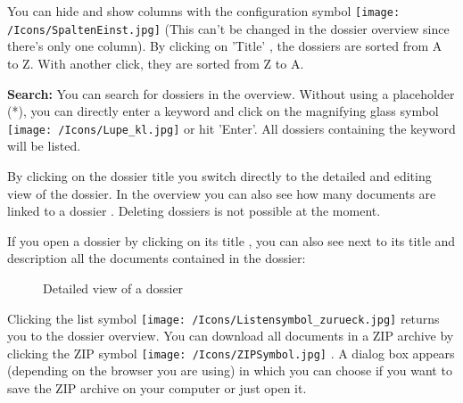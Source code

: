 You can hide and show columns with the configuration symbol \texttt{[image: /Icons/SpaltenEinst.jpg]}  (This can't be changed in the dossier overview since there's only one column). By clicking on 'Title' , the dossiers are sorted from A to Z. With another click, they are sorted from Z to A.

\vspace{\baselineskip}

\textbf{Search:} You can search for dossiers in the overview. Without using a placeholder (*), you can directly enter a keyword and click on the magnifying glass symbol \texttt{[image: /Icons/Lupe\_kl.jpg]}  or hit 'Enter'. All dossiers containing the keyword will be listed. \newline

By clicking on the dossier title  you switch directly to the detailed and editing view of the dossier. In the overview you can also see how many documents are linked to a dossier  . Deleting dossiers is not possible at the moment. \newline

If you open a dossier by clicking on its title , you can also see next to its title and description all the documents contained in the dossier:

\begin{figure}[H]
\caption{Detailed view of a dossier}
\end{figure}

Clicking the list symbol \texttt{[image: /Icons/Listensymbol\_zurueck.jpg]}  returns you to the dossier overview. You can download all documents in a ZIP archive by clicking the ZIP symbol \texttt{[image: /Icons/ZIPSymbol.jpg]} . A dialog box appears (depending on the browser you are using) in which you can choose if you want to save the ZIP archive on your computer or just open it. \newline

